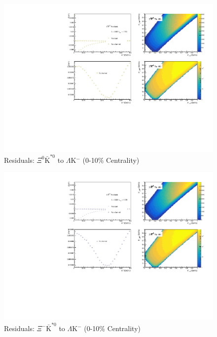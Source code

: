 \documentclass[../AnalysisNoteJBuxton.tex]{subfiles}
\begin{document}
\begin{figure}[h]
  \centering
  \includegraphics[width=\textwidth]{9_AdditionalFigures/Figures/Residuals/LamKchM/Residuals_LamKchM_0010_Xi0AKSt0_MomResCrctn_NonFlatBgdCrctn_10Res_PrimMaxDecay4fm_UsingXiDataAndCoulombOnly.pdf}
  \caption[Residuals: $\Xi^{0}\bar{\mathrm{K}}^{*0}$ to $\Lambda$K$^{-}$ (0-10\% Centrality)]{Residuals: $\Xi^{0}\bar{\mathrm{K}}^{*0}$ to $\Lambda$K$^{-}$ (0-10\% Centrality)}
  \label{fig:Res_LamKchM_0010_Xi0AKSt0}
\end{figure}

\begin{figure}[h]
  \centering
  \includegraphics[width=\textwidth]{9_AdditionalFigures/Figures/Residuals/LamKchM/Residuals_LamKchM_0010_XiAKSt0_MomResCrctn_NonFlatBgdCrctn_10Res_PrimMaxDecay4fm_UsingXiDataAndCoulombOnly.pdf}
  \caption[Residuals: $\Xi^{-}\bar{\mathrm{K}}^{*0}$ to $\Lambda$K$^{-}$ (0-10\% Centrality)]{Residuals: $\Xi^{-}\bar{\mathrm{K}}^{*0}$ to $\Lambda$K$^{-}$ (0-10\% Centrality)}
  \label{fig:Res_LamKchM_0010_XiCAKSt0}
\end{figure}
\end{document}
